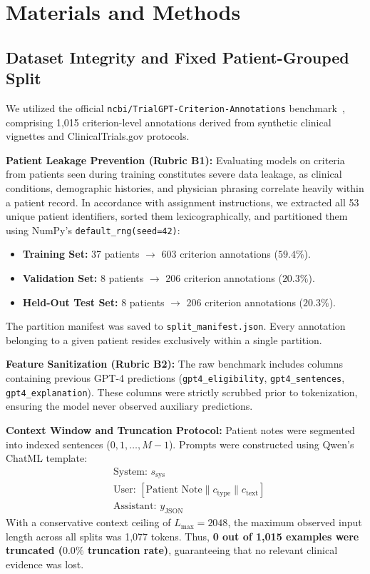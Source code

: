 \documentclass[conference]{IEEEtran}
\begin{document}
\section{Materials and Methods}
\label{sec:methods}

\subsection{Dataset Integrity and Fixed Patient-Grouped Split}
We utilized the official \texttt{ncbi/TrialGPT-Criterion-Annotations} benchmark~\cite{jin2024trialgpt}, comprising 1,015 criterion-level annotations derived from synthetic clinical vignettes and ClinicalTrials.gov protocols.

\textbf{Patient Leakage Prevention (Rubric B1):} Evaluating models on criteria from patients seen during training constitutes severe data leakage, as clinical conditions, demographic histories, and physician phrasing correlate heavily within a patient record. In accordance with assignment instructions, we extracted all 53 unique patient identifiers, sorted them lexicographically, and partitioned them using NumPy's \texttt{default\_rng(seed=42)}:
\begin{itemize}
    \item \textbf{Training Set:} 37 patients $\to$ 603 criterion annotations ($59.4\%$).
    \item \textbf{Validation Set:} 8 patients $\to$ 206 criterion annotations ($20.3\%$).
    \item \textbf{Held-Out Test Set:} 8 patients $\to$ 206 criterion annotations ($20.3\%$).
\end{itemize}
The partition manifest was saved to \texttt{split\_manifest.json}. Every annotation belonging to a given patient resides exclusively within a single partition.

\textbf{Feature Sanitization (Rubric B2):} The raw benchmark includes columns containing previous GPT-4 predictions (\texttt{gpt4\_eligibility}, \texttt{gpt4\_sentences}, \texttt{gpt4\_explanation}). These columns were strictly scrubbed prior to tokenization, ensuring the model never observed auxiliary predictions.

\textbf{Context Window and Truncation Protocol:} Patient notes were segmented into indexed sentences ($0, 1, \dots, M-1$). Prompts were constructed using Qwen's ChatML template:
\begin{align*}
    &\text{System: } s_{\text{sys}} \\
    &\text{User: } [\text{Patient Note} \parallel c_{\text{type}} \parallel c_{\text{text}}] \\
    &\text{Assistant: } y_{\text{JSON}}
\end{align*}
With a conservative context ceiling of $L_{\max} = 2048$, the maximum observed input length across all splits was 1,077 tokens. Thus, \textbf{0 out of 1,015 examples were truncated ($0.0\%$ truncation rate)}, guaranteeing that no relevant clinical evidence was lost.
\end{document}
